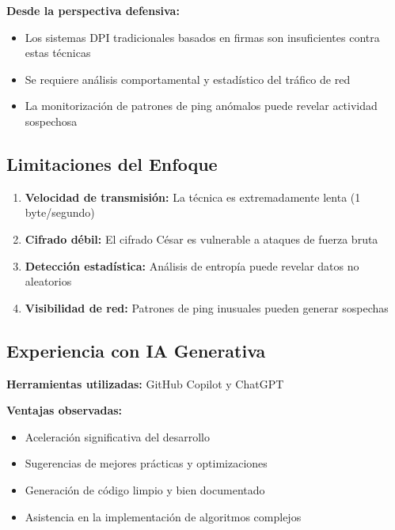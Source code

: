 \documentclass[letter,12pt]{article}
\begin{document}
\textbf{Desde la perspectiva defensiva:}
\begin{itemize}
    \item Los sistemas DPI tradicionales basados en firmas son insuficientes contra estas técnicas
    
    \item Se requiere análisis comportamental y estadístico del tráfico de red
    
    \item La monitorización de patrones de ping anómalos puede revelar actividad sospechosa
\end{itemize}

\subsection*{Limitaciones del Enfoque}

\begin{enumerate}
    \item \textbf{Velocidad de transmisión:} La técnica es extremadamente lenta (1 byte/segundo)
    
    \item \textbf{Cifrado débil:} El cifrado César es vulnerable a ataques de fuerza bruta
    
    \item \textbf{Detección estadística:} Análisis de entropía puede revelar datos no aleatorios
    
    \item \textbf{Visibilidad de red:} Patrones de ping inusuales pueden generar sospechas
\end{enumerate}

\subsection*{Experiencia con IA Generativa}

\textbf{Herramientas utilizadas:} GitHub Copilot y ChatGPT

\textbf{Ventajas observadas:}
\begin{itemize}
    \item Aceleración significativa del desarrollo
    
    \item Sugerencias de mejores prácticas y optimizaciones
    
    \item Generación de código limpio y bien documentado
    
    \item Asistencia en la implementación de algoritmos complejos
\end{itemize}
\end{document}
